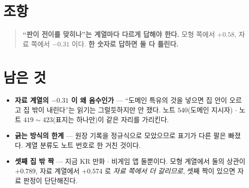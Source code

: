 \documentclass[11pt]{article}
\begin{document}
\section*{조항}

\begin{quote}
\textbf{``판이 전이를 맞히나''는 계열마다 다르게 답해야 한다.} 모형 쪽에서
$+0.58$, 자료 쪽에서 $-0.31$ 이다. \textbf{한 숫자로 답하면 둘 다 틀린다.}
\end{quote}

\section*{남은 것}

\begin{itemize}
\item \textbf{자료 계열의 $-0.31$ 이 왜 음수인가} --- ``도메인 특유의 것을
넣으면 집 안이 오르고 집 밖이 내린다''는 읽기는 그럴듯하지만 안 쟀다.
노트 $540$(도메인 지시자) $\cdot$ 노트 $419\!\sim\!423$(표지는 하나만)이
같은 자리를 가리킨다.
\item \textbf{긁는 방식의 한계} --- 원장 기록을 정규식으로 모았으므로 표기가
다른 팔은 빠졌다. 계열 분류도 노트 번호로 한 거친 것이다.
\item \textbf{셋째 집 밖 짝} --- 지금 KR 만화 $\cdot$ 비게임 앱 둘뿐이다.
모형 계열에서 둘의 상관이 $+0.789$, 자료 계열에서 $+0.574$ 로 \emph{자료
쪽에서 더 갈리므로}, 셋째 짝이 있으면 자료 판정이 단단해진다.
\end{itemize}
\end{document}
